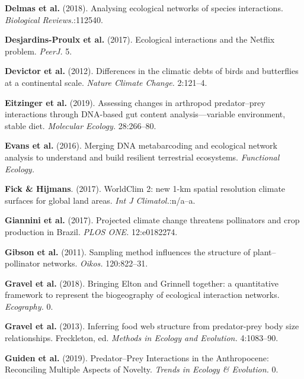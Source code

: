 \leavevmode\hypertarget{ref-DelmBess18}{}%
\textbf{Delmas et al.} (2018). Analysing ecological networks of species
interactions. \emph{Biological Reviews.}:112540.

\leavevmode\hypertarget{ref-DesjLaig17}{}%
\textbf{Desjardins-Proulx et al.} (2017). Ecological interactions and
the Netflix problem. \emph{PeerJ.} 5.

\leavevmode\hypertarget{ref-Devivan12}{}%
\textbf{Devictor et al.} (2012). Differences in the climatic debts of
birds and butterflies at a continental scale. \emph{Nature Climate
Change.} 2:121--4.

\leavevmode\hypertarget{ref-EitzAbre19}{}%
\textbf{Eitzinger et al.} (2019). Assessing changes in arthropod
predator--prey interactions through DNA-based gut content
analysis---variable environment, stable diet. \emph{Molecular Ecology.}
28:266--80.

\leavevmode\hypertarget{ref-EvanKits16}{}%
\textbf{Evans et al.} (2016). Merging DNA metabarcoding and ecological
network analysis to understand and build resilient terrestrial
ecosystems. \emph{Functional Ecology.}

\leavevmode\hypertarget{ref-FickHijm17}{}%
\textbf{Fick \& Hijmans}. (2017). WorldClim 2: new 1-km spatial
resolution climate surfaces for global land areas. \emph{Int J
Climatol.}:n/a--a.

\leavevmode\hypertarget{ref-GianCost17}{}%
\textbf{Giannini et al.} (2017). Projected climate change threatens
pollinators and crop production in Brazil. \emph{PLOS ONE.} 12:e0182274.

\leavevmode\hypertarget{ref-GibsKnot11}{}%
\textbf{Gibson et al.} (2011). Sampling method influences the structure
of plant--pollinator networks. \emph{Oikos.} 120:822--31.

\leavevmode\hypertarget{ref-GravBais18}{}%
\textbf{Gravel et al.} (2018). Bringing Elton and Grinnell together: a
quantitative framework to represent the biogeography of ecological
interaction networks. \emph{Ecography.} 0.

\leavevmode\hypertarget{ref-GravPois13}{}%
\textbf{Gravel et al.} (2013). Inferring food web structure from
predator-prey body size relationships. Freckleton, ed. \emph{Methods in
Ecology and Evolution.} 4:1083--90.

\leavevmode\hypertarget{ref-GuidBart19}{}%
\textbf{Guiden et al.} (2019). Predator--Prey Interactions in the
Anthropocene: Reconciling Multiple Aspects of Novelty. \emph{Trends in
Ecology \& Evolution.} 0.


